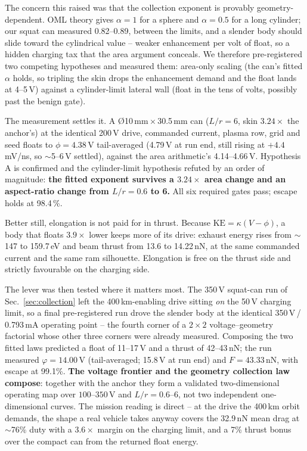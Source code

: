 \documentclass[11pt]{article}
\begin{document}
The concern this raised was that the collection exponent is provably
geometry-dependent. OML theory gives $\alpha = 1$ for a sphere and
$\alpha = 0.5$ for a long cylinder; our squat can measured 0.82--0.89,
between the limits, and a slender body should slide toward the cylindrical
value -- weaker enhancement per volt of float, so a hidden charging tax that
the area argument conceals. We therefore pre-registered two competing
hypotheses and measured them: area-only scaling (the can's fitted $\alpha$
holds, so tripling the skin drops the enhancement demand and the float lands
at 4--5\,V) against a cylinder-limit lateral wall (float in the tens of
volts, possibly past the benign gate).

The measurement settles it. A \O10\,mm\,$\times$\,30.5\,mm can
($L/r = 6$, skin $3.24\times$ the anchor's) at the identical 200\,V drive,
commanded current, plasma row, grid and seed floats to
$\phi = 4.38$\,V tail-averaged (4.79\,V at run end, still rising at
$+4.4$\,mV/ns, so $\sim$5--6\,V settled), against the area arithmetic's
4.14--4.66\,V. Hypothesis A is confirmed and the cylinder-limit hypothesis
refuted by an order of magnitude: \textbf{the fitted exponent survives a
$3.24\times$ area change and an aspect-ratio change from $L/r = 0.6$ to 6.}
All six required gates pass; escape holds at 98.4\,\%.

Better still, elongation is not paid for in thrust. Because
$\mathrm{KE} = \kappa(V-\phi)$, a body that floats $3.9\times$ lower keeps
more of its drive: exhaust energy rises from $\sim$147 to 159.7\,eV and beam
thrust from 13.6 to 14.22\,nN, at the same commanded current and the same
ram silhouette. Elongation is free on the thrust side and strictly
favourable on the charging side.

The lever was then tested where it matters most. The 350\,V squat-can run
of Sec.~\ref{sec:collection} left the 400\,km-enabling drive sitting
\emph{on} the 50\,V charging limit, so a final pre-registered run drove
the slender body at the identical 350\,V\,/\,0.793\,mA operating point --
the fourth corner of a $2{\times}2$ voltage--geometry factorial whose
other three corners were already measured. Composing the two fitted laws
predicted a float of 11--17\,V and a thrust of 42--43\,nN; the run
measured $\varphi = 14.00$\,V (tail-averaged; 15.8\,V at run end) and
$F = 43.33$\,nN, with escape at 99.1\%. \textbf{The voltage frontier and
the geometry collection law compose}: together with the anchor they form
a validated two-dimensional operating map over $100$--$350$\,V and
$L/r = 0.6$--$6$, not two independent one-dimensional curves. The mission
reading is direct -- at the drive the 400\,km orbit demands, the shape a
real vehicle takes anyway covers the 32.9\,nN mean drag at $\sim$76\%
duty with a $3.6\times$ margin on the charging limit, and a 7\% thrust
bonus over the compact can from the returned float energy.
\end{document}

